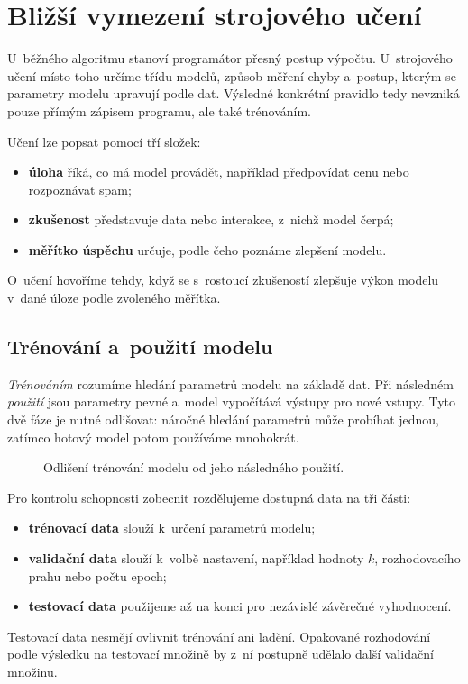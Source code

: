 \section{Bližší vymezení strojového učení}\label{sec:ai-vymezeni-ml}

U~běžného algoritmu stanoví programátor přesný postup výpočtu. U~strojového učení místo toho určíme třídu modelů, způsob měření chyby a~postup, kterým se parametry modelu upravují podle dat. Výsledné konkrétní pravidlo tedy nevzniká pouze přímým zápisem programu, ale také trénováním.

Učení lze popsat pomocí tří složek:
\begin{itemize}
    \item \textbf{úloha} říká, co má model provádět, například předpovídat cenu nebo rozpoznávat spam;
    \item \textbf{zkušenost} představuje data nebo interakce, z~nichž model čerpá;
    \item \textbf{měřítko úspěchu} určuje, podle čeho poznáme zlepšení modelu.
\end{itemize}
O~učení hovoříme tehdy, když se s~rostoucí zkušeností zlepšuje výkon modelu v~dané úloze podle zvoleného měřítka.

\subsection{Trénování a~použití modelu}

\emph{Trénováním} rozumíme hledání parametrů modelu na základě dat. Při následném \emph{použití} jsou parametry pevné a~model vypočítává výstupy pro nové vstupy. Tyto dvě fáze je nutné odlišovat: náročné hledání parametrů může probíhat jednou, zatímco hotový model potom používáme mnohokrát.

\begin{figure}[ht]
    \centering
    
    \caption{Odlišení trénování modelu od jeho následného použití.}
    \label{fig:ai-trenovani-pouziti}
\end{figure}

Pro kontrolu schopnosti zobecnit rozdělujeme dostupná data na tři části:
\begin{itemize}
    \item \textbf{trénovací data} slouží k~určení parametrů modelu;
    \item \textbf{validační data} slouží k~volbě nastavení, například hodnoty \(k\), rozhodovacího prahu nebo počtu epoch;
    \item \textbf{testovací data} použijeme až na konci pro nezávislé závěrečné vyhodnocení.
\end{itemize}
Testovací data nesmějí ovlivnit trénování ani ladění. Opakované rozhodování podle výsledku na testovací množině by z~ní postupně udělalo další validační množinu.


